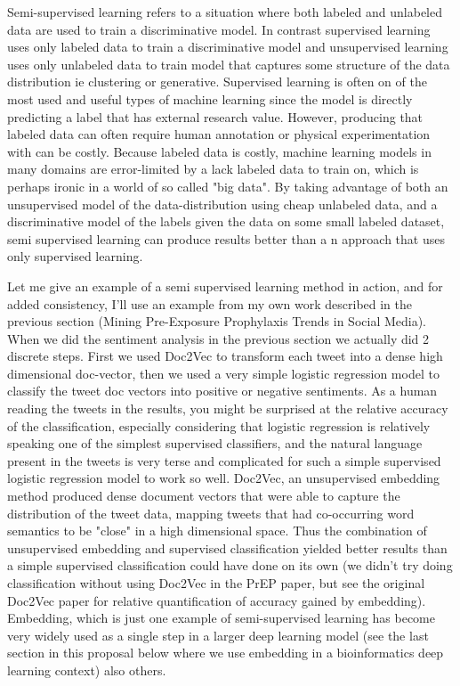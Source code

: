 Semi-supervised learning refers to a situation where both labeled and unlabeled data are used to train a discriminative model\cite{zhu2011semi}. In contrast supervised learning uses only labeled data to train a discriminative model and unsupervised learning uses only unlabeled data to train model that captures some structure of the data distribution ie clustering or generative. Supervised learning is often on of the most used and useful types of machine learning since the model is directly predicting a label that has external research value. However, producing that labeled data can often require human annotation or physical experimentation with can be costly. Because labeled data is costly, machine learning models in many domains are error-limited by a lack labeled data to train on\cite{guillaumin2010multimodal}, which is perhaps ironic in a world of so called "big data". By taking advantage of both an unsupervised model of the data-distribution using cheap unlabeled data, and a discriminative model of the labels given the data on some small labeled dataset, semi supervised learning can produce results better than a n approach that uses only supervised learning.

Let me give an example of a semi supervised learning method in action, and for added consistency, I'll use an example from my own work described in the previous section (Mining Pre-Exposure Prophylaxis Trends in Social Media). When we did the sentiment analysis in the previous section we actually did 2 discrete steps. First we used Doc2Vec to transform each tweet into a dense high dimensional doc-vector, then we used a very simple logistic regression model to classify the tweet doc vectors into positive or negative sentiments. As a human reading the tweets in the results, you might be surprised at the relative accuracy of the classification, especially considering that logistic regression is relatively speaking one of the simplest supervised classifiers, and the natural language present in the tweets is very terse and complicated for such a simple supervised logistic regression model to work so well. Doc2Vec, an unsupervised embedding method produced dense document vectors that were able to capture the distribution of the tweet data, mapping tweets that had co-occurring word semantics to be "close" in a high dimensional space. Thus the combination of unsupervised embedding and supervised classification yielded better results than a simple supervised classification could have done on its own (we didn't try doing classification without using Doc2Vec in the PrEP paper, but see the original Doc2Vec paper for relative quantification of accuracy gained by embedding\cite{le2014distributed}). Embedding, which is just one example of semi-supervised learning has become very widely used as a single step in a larger deep learning model (see the last section in this proposal below where we use embedding in a bioinformatics deep learning context) also others\cite{weston2012deep}.

